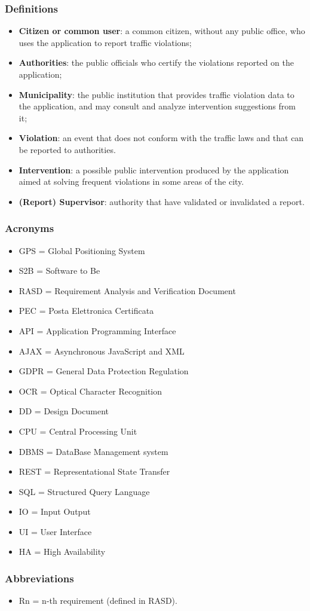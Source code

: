 \subsubsection{Definitions}
\begin{itemize}
	\item \textbf{Citizen or common user}: a common citizen, without any public office, who uses the application to report traffic violations;
	\item \textbf{Authorities}: the public officials who certify the violations reported on the application;
	\item \textbf{Municipality}: the public institution that provides traffic violation data to the application, and may consult and analyze intervention suggestions from it;
	\item \textbf{Violation}: an event that does not conform with the traffic laws and that can be reported to authorities.
	\item \textbf{Intervention}: a possible public intervention produced by the application aimed at solving frequent violations in some areas of the city.
	\item \textbf{(Report) Supervisor}: authority that have validated or invalidated a report.
\end{itemize}
\subsubsection{Acronyms}
\begin{itemize}
	\item GPS = Global Positioning System
	\item S2B = Software to Be
	\item RASD = Requirement Analysis and Verification Document
	\item PEC = Posta Elettronica Certificata
	\item API = Application Programming Interface
	\item AJAX = Asynchronous JavaScript and XML
	\item GDPR = General Data Protection Regulation
	\item OCR = Optical Character Recognition
	\item DD = Design Document
	\item CPU = Central Processing Unit
	\item DBMS = DataBase Management system
	\item REST = Representational State Transfer
	\item SQL = Structured Query Language
	\item IO = Input Output
	\item UI = User Interface
	\item HA = High Availability
\end{itemize}
\subsubsection{Abbreviations}
\begin{itemize}
	\item Rn = n-th requirement (defined in RASD).
\end{itemize}